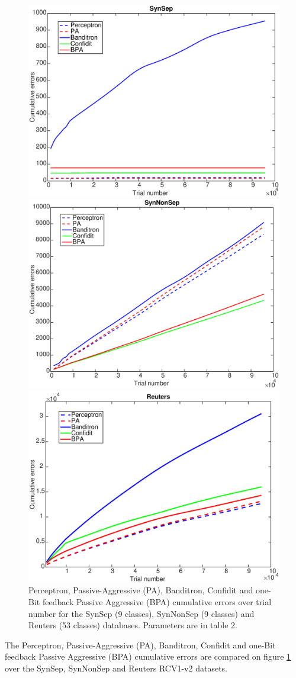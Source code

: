 \documentclass[preprint,12pt,authoryear]{elsarticle}
\begin{document}
\begin{figure}[htp]
	
	\centerline{
		\includegraphics[width=.6\linewidth]{figs/SynSep.eps}
	}
	
	\centerline{
		\includegraphics[width=.6\linewidth]{figs/SynNonSep.eps}
	}
	\centerline{
		\includegraphics[width=.6\linewidth]{figs/RCV1_v2_53class.eps}}
	\caption{Perceptron, Passive-Aggressive (PA), Banditron, Confidit and one-Bit feedback Passive Aggressive (BPA) cumulative errors  over trial number for the SynSep (9 classes), SynNonSep (9 classes) and Reuters (53 classes) databases. Parameters are in table 2.}
	\label{pic:BPASS}
\end{figure}

The Perceptron, Passive-Aggressive (PA), Banditron, Confidit and one-Bit feedback Passive Aggressive (BPA) cumulative errors are compared on figure \ref{pic:BPASS} over the SynSep, SynNonSep and Reuters RCV1-v2 datasets. 
\end{document}
